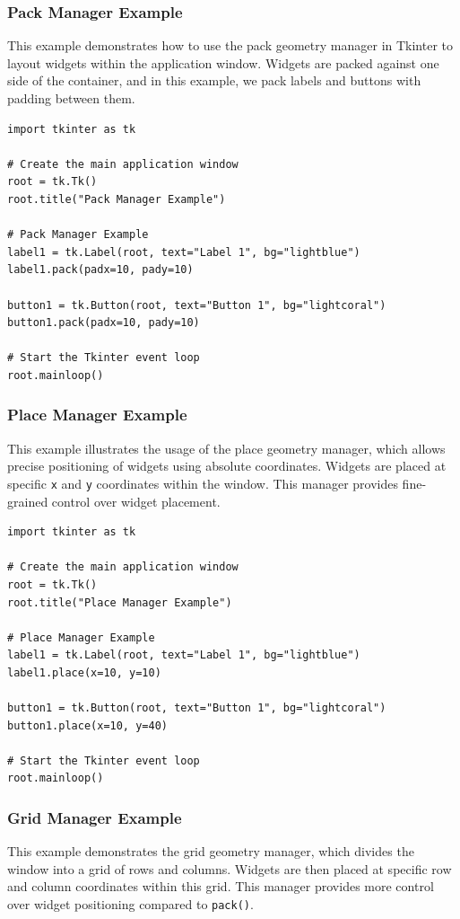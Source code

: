 \subsubsection{Pack Manager Example}
This example demonstrates how to use the pack geometry manager in Tkinter to layout widgets within the application window. Widgets are packed against one side of the container, and in this example, we pack labels and buttons with padding between them.

\begin{codebox}
\begin{verbatim}
import tkinter as tk

# Create the main application window
root = tk.Tk()
root.title("Pack Manager Example")

# Pack Manager Example
label1 = tk.Label(root, text="Label 1", bg="lightblue")
label1.pack(padx=10, pady=10)

button1 = tk.Button(root, text="Button 1", bg="lightcoral")
button1.pack(padx=10, pady=10)

# Start the Tkinter event loop
root.mainloop()
\end{verbatim}
\end{codebox}

\newpage
\subsubsection{Place Manager Example}
This example illustrates the usage of the place geometry manager, which allows precise positioning of widgets using absolute coordinates. Widgets are placed at specific \texttt{x} and \texttt{y} coordinates within the window. This manager provides fine-grained control over widget placement.

\begin{codebox}
\begin{verbatim}
import tkinter as tk

# Create the main application window
root = tk.Tk()
root.title("Place Manager Example")

# Place Manager Example
label1 = tk.Label(root, text="Label 1", bg="lightblue")
label1.place(x=10, y=10)

button1 = tk.Button(root, text="Button 1", bg="lightcoral")
button1.place(x=10, y=40)

# Start the Tkinter event loop
root.mainloop()
\end{verbatim}
\end{codebox}

\subsubsection{Grid Manager Example}
This example demonstrates the grid geometry manager, which divides the window into a grid of rows and columns. Widgets are then placed at specific row and column coordinates within this grid. This manager provides more control over widget positioning compared to \texttt{pack()}.

